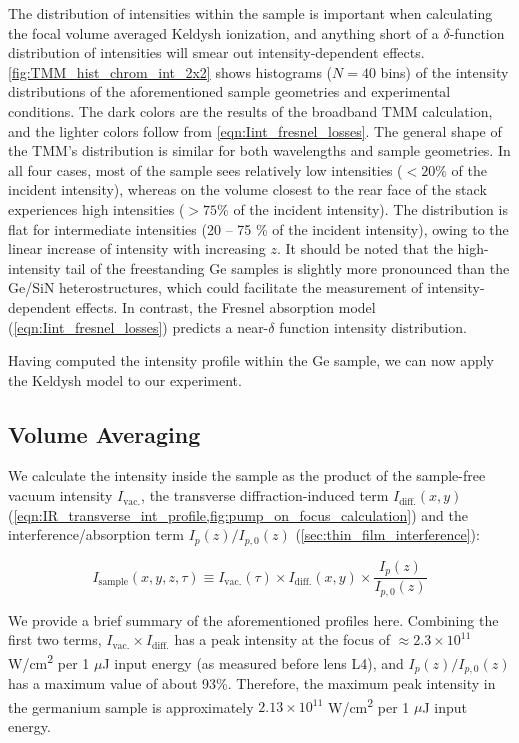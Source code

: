 The distribution of intensities within the sample is important when calculating the focal volume averaged Keldysh ionization, and anything short of a $\delta$-function distribution of intensities will smear out intensity-dependent effects. \cref{fig:TMM_hist_chrom_int_2x2} shows histograms ($N = 40$ bins) of the intensity distributions of the aforementioned sample geometries and experimental conditions. The dark colors are the results of the broadband TMM calculation, and the lighter colors follow from \cref{eqn:Iint_fresnel_losses}. The general shape of the TMM's distribution is similar for both wavelengths and sample geometries. In all four cases, most of the sample sees relatively low intensities ($<20\%$ of the incident intensity), whereas on the volume closest to the rear face of the stack experiences high intensities ($>75\%$ of the incident intensity). The distribution is flat for intermediate intensities ({20 -- 75 \%} of the incident intensity), owing to the linear increase of intensity with increasing $z$. It should be noted that the high-intensity tail of the freestanding Ge samples is slightly more pronounced than the Ge/SiN heterostructures, which could facilitate the measurement of intensity-dependent effects. In contrast, the Fresnel absorption model (\cref{eqn:Iint_fresnel_losses}) predicts a near-$\delta$ function intensity distribution.

Having computed the intensity profile within the Ge sample, we can now apply the Keldysh model to our experiment.

\subsection{Volume Averaging}
\label{sec:volume_averaging}

We calculate the intensity inside the sample as the product of the sample-free vacuum intensity $I_{\textrm{vac.}}$, the transverse diffraction-induced term $I_{\textrm{diff.}}(x, y)$ (\cref{eqn:IR_transverse_int_profile,fig:pump_on_focus_calculation}) and the interference/absorption term $I_p(z) / I_{p,0}(z)$ (\cref{sec:thin_film_interference}):

\begin{equation}
I_{\textrm{sample}}(x, y, z, \tau) \equiv I_{\textrm{vac.}}(\tau) \times I_{\textrm{diff.}}(x, y) \times \frac{I_p(z)}{I_{p,0}(z)}
\label{eqn:sample_intensity_XYZtau}
\end{equation}

We provide a brief summary of the aforementioned profiles here. Combining the first two terms, $I_{\textrm{vac.}} \times I_{\textrm{diff.}}$ has a peak intensity at the focus of $\approx 2.3 \times 10^{11}$ W/cm\textsuperscript{2} per 1 $\mu$J input energy (as measured before lens L4), and $I_p(z) / I_{p,0}(z)$ has a maximum value of about 93\%. Therefore, the maximum peak intensity in the germanium sample is approximately $2.13 \times 10^{11}$ W/cm\textsuperscript{2} per 1 $\mu$J input energy. 


